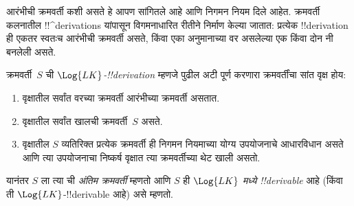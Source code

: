 \documentclass[../../../include/open-logic-section]{subfiles}
\begin{document}
      {}
      {}


\begin{explain}
आरंभीची क्रमवर्ती कशी असते हे आपण सांगितले आहे आणि निगमन नियम दिले आहेत.
क्रमवर्ती कलनातील !!^{derivation}s यांपासून विगमनाधारित रीतीने निर्माण केल्या
जातात: प्रत्येक !!{derivation} ही एकतर स्वतःच आरंभीची क्रमवर्ती असते, किंवा
एका अनुमानाच्या वर असलेल्या एक किंवा दोन नी बनलेली असते.
\end{explain}

\begin{defn}
क्रमवर्ती~$S$ ची \emph{$\Log{LK}$-!!{derivation}} म्हणजे पुढील अटी पूर्ण
करणारा क्रमवर्तींचा सांत वृक्ष होय:
\begin{enumerate}
\item वृक्षातील सर्वांत वरच्या क्रमवर्ती आरंभीच्या क्रमवर्ती असतात.
\item वृक्षातील सर्वांत खालची क्रमवर्ती~$S$ असते.
\item वृक्षातील $S$ व्यतिरिक्त प्रत्येक क्रमवर्ती ही निगमन नियमाच्या योग्य
  उपयोजनाचे आधारविधान असते आणि त्या उपयोजनाचा निष्कर्ष वृक्षात त्या
  क्रमवर्तीच्या थेट खाली असतो.
\end{enumerate}
यानंतर $S$ ला त्या ची \emph{अंतिम क्रमवर्ती} म्हणतो आणि
$S$ ही \emph{$\Log{LK}$ मध्ये !!{derivable}} आहे (किंवा ती
$\Log{LK}$-!!{derivable} आहे) असे म्हणतो.
\end{defn}
\end{document}
